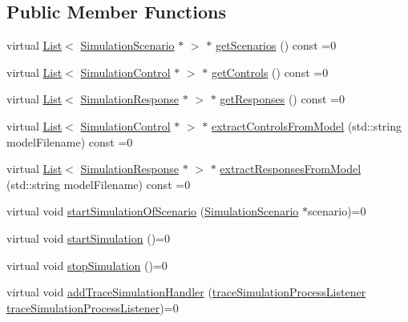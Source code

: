 \subsection*{Public Member Functions}
\begin{DoxyCompactItemize}
\item 
virtual \hyperlink{class_list}{List}$<$ \hyperlink{class_simulation_scenario}{Simulation\+Scenario} $\ast$ $>$ $\ast$ \hyperlink{class_process_analyser__if_a4cec163a7fc994f7d2cc5d642d3f9b84}{get\+Scenarios} () const =0
\item 
virtual \hyperlink{class_list}{List}$<$ \hyperlink{class_simulation_control}{Simulation\+Control} $\ast$ $>$ $\ast$ \hyperlink{class_process_analyser__if_a639a16af5f2ad52e63fce4dc751c9fd4}{get\+Controls} () const =0
\item 
virtual \hyperlink{class_list}{List}$<$ \hyperlink{class_simulation_response}{Simulation\+Response} $\ast$ $>$ $\ast$ \hyperlink{class_process_analyser__if_ab434ec8f01acb7730557f3ff9a460798}{get\+Responses} () const =0
\item 
virtual \hyperlink{class_list}{List}$<$ \hyperlink{class_simulation_control}{Simulation\+Control} $\ast$ $>$ $\ast$ \hyperlink{class_process_analyser__if_a27b1e534ff72b8faecc28ae7419dd588}{extract\+Controls\+From\+Model} (std\+::string model\+Filename) const =0
\item 
virtual \hyperlink{class_list}{List}$<$ \hyperlink{class_simulation_response}{Simulation\+Response} $\ast$ $>$ $\ast$ \hyperlink{class_process_analyser__if_a0a13770b90d56f44fe89e4a2e940800e}{extract\+Responses\+From\+Model} (std\+::string model\+Filename) const =0
\item 
virtual void \hyperlink{class_process_analyser__if_a55396a5eb2eebc928eb7681d1f8f87ea}{start\+Simulation\+Of\+Scenario} (\hyperlink{class_simulation_scenario}{Simulation\+Scenario} $\ast$scenario)=0
\item 
virtual void \hyperlink{class_process_analyser__if_ad0949759ce49af24bba3e8875b164675}{start\+Simulation} ()=0
\item 
virtual void \hyperlink{class_process_analyser__if_aeb292cf1587fda460b9d551bfc65c6e4}{stop\+Simulation} ()=0
\item 
virtual void \hyperlink{class_process_analyser__if_a7c05c8bb79ac9fd70b6ac114d84a9672}{add\+Trace\+Simulation\+Handler} (\hyperlink{_trace_manager_8h_a7ff1963642ecda8c9a76991b351f0385}{trace\+Simulation\+Process\+Listener} \hyperlink{_trace_manager_8h_a7ff1963642ecda8c9a76991b351f0385}{trace\+Simulation\+Process\+Listener})=0
\end{DoxyCompactItemize}


